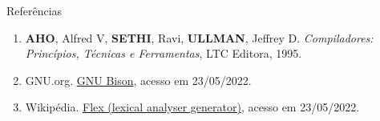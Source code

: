 \begin{frame}[fragile]{Referências}

    \begin{enumerate}
        \item \textbf{AHO}, Alfred V, \textbf{SETHI}, Ravi, \textbf{ULLMAN}, Jeffrey D. \textit{Compiladores: Princípios, Técnicas e Ferramentas}, LTC Editora, 1995.
        \item GNU.org. \href{https://www.gnu.org/software/bison/}{GNU Bison}, acesso em 23/05/2022.

        \item Wikipédia. \href{https://en.wikipedia.org/wiki/Flex\_(lexical\_analyser\_generator)}{Flex (lexical analyser generator)}, acesso em 23/05/2022.

    \end{enumerate}

\end{frame}


